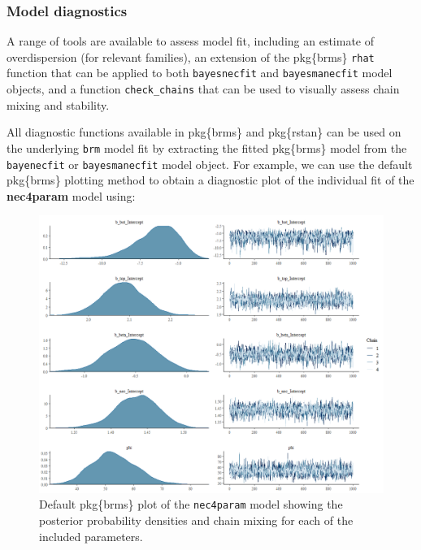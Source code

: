 \documentclass[
]{jss}
\begin{document}
\hypertarget{model-diagnostics}{%
\subsubsection{Model diagnostics}\label{model-diagnostics}}

A range of tools are available to assess model fit, including an
estimate of overdispersion (for relevant families), an extension of the
pkg\{brms\} \texttt{rhat} function that can be applied to both
\texttt{bayesnecfit} and \texttt{bayesmanecfit} model objects, and a
function \texttt{check\_chains} that can be used to visually assess
chain mixing and stability.

All diagnostic functions available in pkg\{brms\} and pkg\{rstan\} can
be used on the underlying \texttt{brm} model fit by extracting the
fitted pkg\{brms\} model from the \texttt{bayenecfit} or
\texttt{bayesmanecfit} model object. For example, we can use the default
pkg\{brms\} plotting method to obtain a diagnostic plot of the
individual fit of the \textbf{nec4param} model using:

\begin{CodeChunk}
\end{CodeChunk}

\begin{figure}
\centering
\includegraphics{brms_plot.png}
\caption{Default pkg\{brms\} plot of the \texttt{nec4param} model
showing the posterior probability densities and chain mixing for each of
the included parameters.\label{fig:brmsplot}}
\end{figure}
\end{document}
